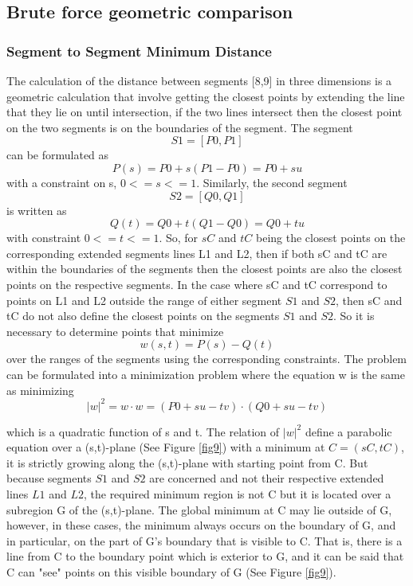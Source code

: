 \subsection{Brute force geometric comparison}

\subsubsection{Segment to Segment Minimum Distance }
The calculation of the distance between segments [8,9] in three dimensions is a geometric calculation that involve getting the closest points by extending the line that they lie on until intersection, if the two lines intersect then the closest point on the two segments is on the boundaries of the segment.
The segment 
$$S1 = [P0, P1]$$
can be formulated as 
$$P(s) = P0+s(P1-P0) = P0+su$$
with a constraint on s, $0<=s<=1$. Similarly, the second segment 
$$S2 = [Q0, Q1]$$
is written as $$Q(t) = Q0+t(Q1-Q0) = Q0+tu$$ with constraint $0<=t<=1$. So, for $sC$ and $tC$ being the closest points on the corresponding extended segments lines L1 and L2, then if  both sC and tC are within the boundaries of the segments then the closest points are also the closest points on the respective segments. 
In the case where sC and tC correspond to points on L1 and L2 outside the range of either segment $S1$ and $S2$, then sC and tC do not also define the closest points on the segments $S1$ and $S2$. So it is necessary to determine points that minimize 
\begin{equation}
w(s,t) = P(s) - Q(t)
\end{equation}
over the ranges of the segments using the corresponding constraints. 
The problem can be formulated into a minimization problem where the equation w is the same as minimizing 
$$|w|^2 = w \cdot w= (P0+su-tv) \cdot (Q0+su-tv)$$

which is a quadratic function of s and t. The relation of $|w|^2$ define a parabolic equation over a (s,t)-plane (See Figure \ref{fig9}) with a minimum at $C = (sC, tC)$, it is strictly growing along the (s,t)-plane with starting point from C. But because segments $S1$ and $S2$ are concerned and not their respective extended lines $L1$ and $L2$, the required minimum region is not C but it is located over a subregion G of the (s,t)-plane. The global minimum at C may lie outside of G, however, in these cases, the minimum always occurs on the boundary of G, and in particular, on the part of G's boundary that is visible to C. That is, there is a line from C to the boundary point which is exterior to G, and it can be said that C can "see" points on this visible boundary of G (See Figure \ref{fig9}).

